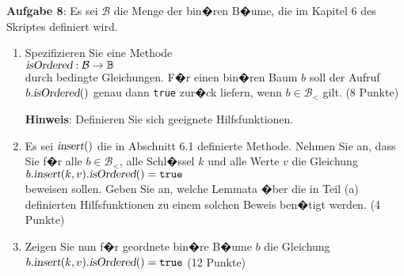 \documentclass{article}
\begin{document}
\noindent
\textbf{Aufgabe 8}:
Es sei $\mathcal{B}$ die Menge der bin�ren B�ume, die im Kapitel 6 des
Skriptes definiert wird.  
\begin{enumerate}
\item Spezifizieren Sie eine Methode \\[0.2cm]
      \hspace*{1.3cm}
      $\textsl{isOrdered}: \mathcal{B} \rightarrow \mathbb{B}$
      \\[0.2cm]
      durch bedingte Gleichungen.  F�r einen bin�ren Baum $b$ soll der Aufruf
      $b.\textsl{isOrdered}()$ genau dann \texttt{true} zur�ck liefern, wenn $b\in \mathcal{B}_<$
      gilt.
      \hspace*{\fill} (8 Punkte)

      \textbf{Hinweis}: Definieren Sie sich geeignete Hilfsfunktionen.
\item Es sei $\textsl{insert}()$ die in Abschnitt 6.1 definierte Methode.
      Nehmen Sie an, dass Sie f�r alle $b\in \mathcal{B}_<$, alle Schl�ssel $k$ und alle Werte
      $v$ die Gleichung
      \\[0.2cm]
      \hspace*{1.3cm} $b.\textsl{insert}(k,v).\textsl{isOrdered}() = \texttt{true}$
      \\[0.2cm]
      beweisen sollen.  Geben Sie an, welche Lemmata �ber die in Teil (a) definierten
      Hilfsfunktionen zu einem solchen Beweis ben�tigt werden.
      \hspace*{\fill} (4 Punkte)
\item Zeigen Sie nun f�r geordnete bin�re B�ume $b$ die Gleichung
      \\[0.2cm]
      \hspace*{1.3cm} $b.\textsl{insert}(k,v).\textsl{isOrdered}() = \texttt{true}$
      \hspace*{\fill} (12 Punkte)
\end{enumerate}
\end{document}
